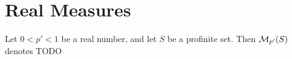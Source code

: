 \section{Real Measures}

\begin{definition}
  \label{real-measures}
  Let $0 < p' < 1$ be a real number, and let $S$ be a profinite set.
  Then $\mathcal M_{p'}(S)$ denotes TODO
\end{definition}

